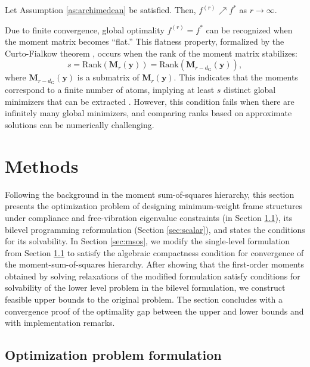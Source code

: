 \documentclass[final,onefignum,onetabnum]{siamart220329}
\begin{document}
\begin{theorem}\label{th:convergence}
    Let Assumption \ref{as:archimedean} be satisfied. Then, $f^{(r)}\nearrow f^*$ as $r\rightarrow \infty$.
\end{theorem}

{Due to finite convergence, global optimality $f^{(r)}=f^*$ can be recognized when the moment matrix becomes ``flat.'' This flatness property, formalized by the Curto-Fialkow theorem \cite{Curto1996}, occurs when the rank of the moment matrix stabilizes:
%
\begin{equation}\label{eq:flatextension}
    s = \mathrm{Rank}(\mathbf{M}_r(\mathbf{y})) = \mathrm{Rank}(\mathbf{M}_{r-d_{\mathrm{G}}}(\mathbf{y})),
\end{equation}
%
where $\mathbf{M}_{r-d_{\mathrm{G}}}(\mathbf{y})$ is a submatrix of $\mathbf{M}_r(\mathbf{y})$. This indicates that the moments correspond to a finite number of atoms, implying at least $s$ distinct global minimizers that can be extracted \cite{Henrion2005}. However, this condition fails when there are infinitely many global minimizers, and comparing ranks based on approximate solutions can be numerically challenging.}

\section{Methods}

Following the background in the moment sum-of-squares hierarchy, this section presents the optimization problem of designing minimum-weight frame structures under compliance and free-vibration eigenvalue constraints (in Section \ref{sec:formulation}), its bilevel programming reformulation (Section \ref{sec:scalar}), and states the conditions for its solvability. In Section \ref{sec:msos}, we modify the single-level formulation from Section \ref{sec:formulation} to satisfy the algebraic compactness condition for convergence of the moment-sum-of-squares hierarchy. After showing that the first-order moments obtained by solving relaxations of the modified formulation satisfy conditions for solvability of the lower level problem in the bilevel formulation, we construct feasible upper bounds to the original problem. The section concludes with a convergence proof of the optimality gap between the upper and lower bounds and with implementation remarks.

\subsection{Optimization problem formulation}\label{sec:formulation}
\end{document}
